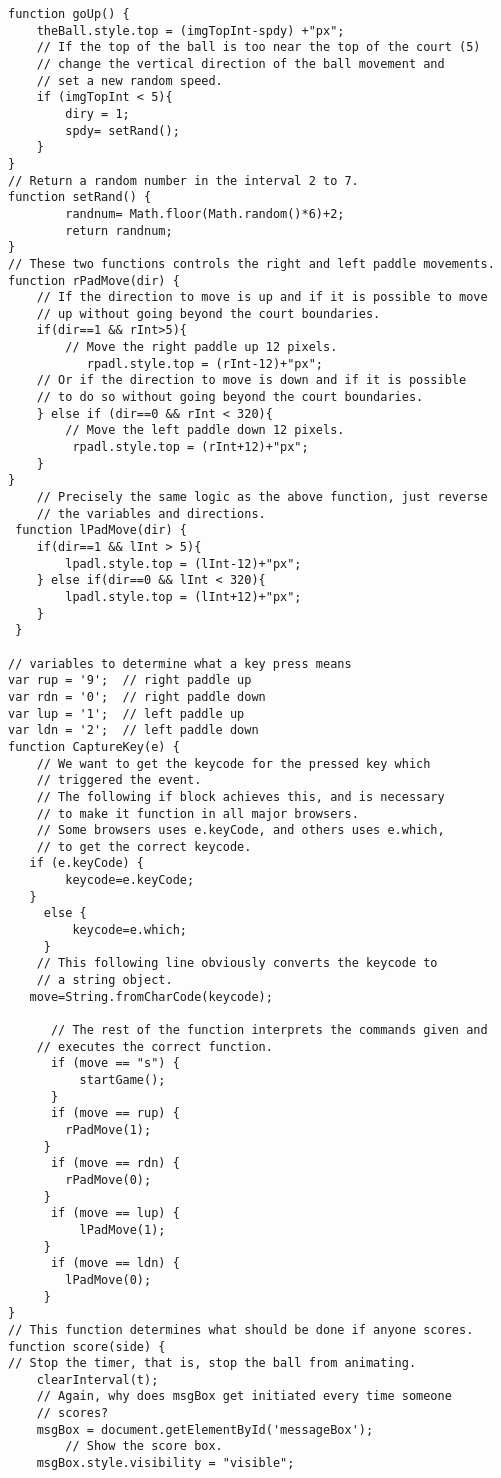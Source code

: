 \documentclass[a4paper,10pt]{article}
\begin{document}
\begin{verbatim}
function goUp() {
    theBall.style.top = (imgTopInt-spdy) +"px";
    // If the top of the ball is too near the top of the court (5)
    // change the vertical direction of the ball movement and 
    // set a new random speed.
    if (imgTopInt < 5){
        diry = 1;
        spdy= setRand();
    }
}
// Return a random number in the interval 2 to 7.
function setRand() {
        randnum= Math.floor(Math.random()*6)+2;
        return randnum;
}
// These two functions controls the right and left paddle movements.
function rPadMove(dir) {
    // If the direction to move is up and if it is possible to move
    // up without going beyond the court boundaries.
    if(dir==1 && rInt>5){
        // Move the right paddle up 12 pixels.
           rpadl.style.top = (rInt-12)+"px";
    // Or if the direction to move is down and if it is possible
    // to do so without going beyond the court boundaries.
    } else if (dir==0 && rInt < 320){
        // Move the left paddle down 12 pixels.
         rpadl.style.top = (rInt+12)+"px";
    }
}
    // Precisely the same logic as the above function, just reverse
    // the variables and directions.
 function lPadMove(dir) {
    if(dir==1 && lInt > 5){
        lpadl.style.top = (lInt-12)+"px";
    } else if(dir==0 && lInt < 320){
        lpadl.style.top = (lInt+12)+"px";
    }
 }

// variables to determine what a key press means
var rup = '9';  // right paddle up
var rdn = '0';  // right paddle down
var lup = '1';  // left paddle up
var ldn = '2';  // left paddle down
function CaptureKey(e) {
    // We want to get the keycode for the pressed key which
    // triggered the event.
    // The following if block achieves this, and is necessary
    // to make it function in all major browsers.
    // Some browsers uses e.keyCode, and others uses e.which,
    // to get the correct keycode.
   if (e.keyCode) {
        keycode=e.keyCode;
   }
     else {
         keycode=e.which;   
     }
    // This following line obviously converts the keycode to 
    // a string object.
   move=String.fromCharCode(keycode);
  
      // The rest of the function interprets the commands given and
    // executes the correct function.
      if (move == "s") {
          startGame();       
      }
      if (move == rup) {
        rPadMove(1);
     }
      if (move == rdn) {
        rPadMove(0);
     }
      if (move == lup) {
          lPadMove(1);
     }
      if (move == ldn) {
        lPadMove(0);
     }
}
// This function determines what should be done if anyone scores.
function score(side) {
// Stop the timer, that is, stop the ball from animating.
    clearInterval(t);
    // Again, why does msgBox get initiated every time someone
    // scores?
    msgBox = document.getElementById('messageBox');
        // Show the score box.
    msgBox.style.visibility = "visible";


\end{verbatim}
\end{document}
